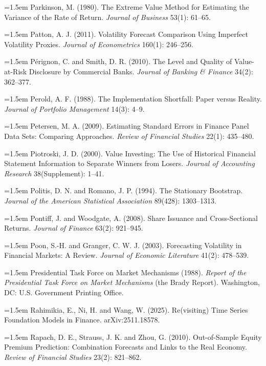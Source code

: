 \hangindent=1.5em Parkinson, M. (1980). The Extreme Value Method for Estimating the Variance of the Rate of Return. \emph{Journal of Business} 53(1): 61--65.

\hangindent=1.5em Patton, A. J. (2011). Volatility Forecast Comparison Using Imperfect Volatility Proxies. \emph{Journal of Econometrics} 160(1): 246--256.

\hangindent=1.5em P\'erignon, C. and Smith, D. R. (2010). The Level and Quality of Value-at-Risk Disclosure by Commercial Banks. \emph{Journal of Banking \& Finance} 34(2): 362--377.

\hangindent=1.5em Perold, A. F. (1988). The Implementation Shortfall: Paper versus Reality. \emph{Journal of Portfolio Management} 14(3): 4--9.

\hangindent=1.5em Petersen, M. A. (2009). Estimating Standard Errors in Finance Panel Data Sets: Comparing Approaches. \emph{Review of Financial Studies} 22(1): 435--480.

\hangindent=1.5em Piotroski, J. D. (2000). Value Investing: The Use of Historical Financial Statement Information to Separate Winners from Losers. \emph{Journal of Accounting Research} 38(Supplement): 1--41.

\hangindent=1.5em Politis, D. N. and Romano, J. P. (1994). The Stationary Bootstrap. \emph{Journal of the American Statistical Association} 89(428): 1303--1313.

\hangindent=1.5em Pontiff, J. and Woodgate, A. (2008). Share Issuance and Cross-Sectional Returns. \emph{Journal of Finance} 63(2): 921--945.

\hangindent=1.5em Poon, S.-H. and Granger, C. W. J. (2003). Forecasting Volatility in Financial Markets: A Review. \emph{Journal of Economic Literature} 41(2): 478--539.

\hangindent=1.5em Presidential Task Force on Market Mechanisms (1988). \emph{Report of the Presidential Task Force on Market Mechanisms} (the Brady Report). Washington, DC: U.S. Government Printing Office.

\hangindent=1.5em Rahimikia, E., Ni, H. and Wang, W. (2025). Re(visiting) Time Series Foundation Models in Finance. arXiv:2511.18578.

\hangindent=1.5em Rapach, D. E., Strauss, J. K. and Zhou, G. (2010). Out-of-Sample Equity Premium Prediction: Combination Forecasts and Links to the Real Economy. \emph{Review of Financial Studies} 23(2): 821--862.

